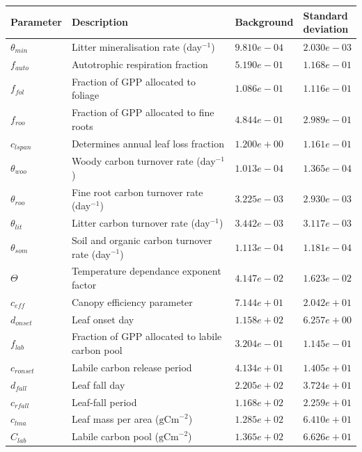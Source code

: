 \documentclass[11pt]{article}
\begin{document}
\begin{table}[ht] 
\begin{center}
	\begin{tabular}{| l | l | l | l |}
	\hline
	Parameter & Description & Background & \pbox{7cm}{Standard \\deviation} \\ \hline
$\theta_{min}$ & Litter mineralisation rate (day$^{-1}$) & $9.810e-04$ & $2.030e-03$ \\ \hline
$f_{auto}$ & Autotrophic respiration fraction & $5.190e-01$ & $1.168e-01$  \\ \hline
$f_{fol}$ & Fraction of GPP allocated to foliage & $1.086e-01$ & $1.116e-01$ \\ \hline
$f_{roo}$ & Fraction of GPP allocated to fine roots & $4.844e-01$ & $2.989e-01$ \\ \hline
$c_{lspan}$ & Determines annual leaf loss fraction & $1.200e+00$ & $1.161e-01$  \\ \hline
$\theta_{woo}$ & Woody carbon turnover rate (day$^{-1}$) & $1.013e-04$ & $1.365e-04$  \\ \hline
$\theta_{roo}$ & Fine root carbon turnover rate (day$^{-1}$) & $3.225e-03$ & $2.930e-03$ \\ \hline
$\theta_{lit}$ & Litter carbon turnover rate (day$^{-1}$) & $3.442e-03$ & $3.117e-03$ \\ \hline
$\theta_{som}$ & Soil and organic carbon turnover rate (day$^{-1}$) & $1.113e-04$ & $1.181e-04$ \\ \hline
$\Theta$ & Temperature dependance exponent factor & $4.147e-02$ & $1.623e-02$ \\ \hline
$c_{eff}$ & Canopy efficiency parameter & $7.144e+01$ & $2.042e+01$  \\ \hline
$d_{onset}$ & Leaf onset day & $1.158e+02$ & $6.257e+00$ \\ \hline
$f_{lab}$ & Fraction of GPP allocated to labile carbon pool & $3.204e-01$ & $1.145e-01$ \\ \hline
$c_{ronset}$ & Labile carbon release period & $4.134e+01$ & $1.405e+01$ \\ \hline
$d_{fall}$ & Leaf fall day & $2.205e+02$ & $3.724e+01$ \\ \hline
$c_{rfall}$ & Leaf-fall period & $1.168e+02$ & $2.259e+01$  \\ \hline
$c_{lma}$ & Leaf mass per area ($\text{gCm}^{-2}$) & $1.285e+02$ & $6.410e+01$ \\ \hline
$C_{lab}$ & Labile carbon pool ($\text{gCm}^{-2}$) & $1.365e+02$ & $6.626e+01$ \\ \hline

\end{tabular}
\end{center}
\end{table}
\end{document}

